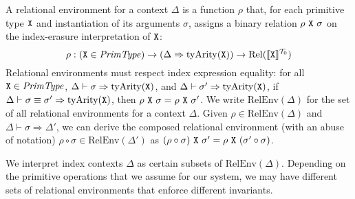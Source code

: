 A relational environment for a context $\Delta$ is a %
function $\rho$ that, for each primitive type $\textup{\texttt{X}}$ and
instantiation of its arguments $\sigma$, assigns a binary relation
$\rho\ \tyPrimNm{X}\ \sigma$ on the index-erasure interpretation of
$\textup{\texttt{X}}$:
\begin{displaymath}
  \rho : (\textup{\texttt{X}} \in \mathit{PrimType}) \to (\Delta \Rightarrow \mathrm{tyArity}(\textup{\texttt{X}})) \to \mathrm{Rel}(\llbracket \textup{\texttt{X}} \rrbracket^{\mathcal{T}_0})
\end{displaymath}
Relational environments must respect index expression equality: for
all $\textup{\texttt{X}} \in \mathit{PrimType}$,
$\Delta \vdash \sigma \Rightarrow
\mathrm{tyArity}(\textup{\texttt{X}})$, and $\Delta \vdash \sigma' \Rightarrow
\mathrm{tyArity}(\textup{\texttt{X}})$, if $\Delta \vdash \sigma \equiv \sigma'
\Rightarrow \mathrm{tyArity}(\textup{\texttt{X}})$, then $\rho\ \textup{\texttt{X}}\
\sigma = \rho\ \textup{\texttt{X}}\ \sigma'$.
%
We write $\mathrm{RelEnv}(\Delta)$ for the set of all relational
environments for a context $\Delta$. Given %
$\rho \in \mathrm{RelEnv}(\Delta)$ and %
$\Delta \vdash \sigma \Rightarrow \Delta'$, we can derive the composed
relational environment (with an abuse of notation) $\rho \circ \sigma
\in \mathrm{RelEnv}(\Delta')$ as $(\rho \circ \sigma)\ \textup{\texttt{X}}\
\sigma' = \rho\ \textup{\texttt{X}}\ (\sigma' \circ \sigma)$.

We interpret index contexts $\Delta$ as certain
subsets of $\mathrm{RelEnv}(\Delta)$. Depending on the primitive
operations that we assume for our system, we may have different sets
of relational environments that enforce different invariants. 

